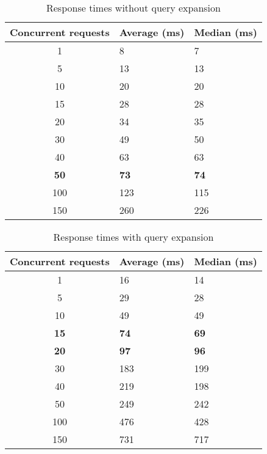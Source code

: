 \begin{table}[h]
    \centering
    \begin{tabular}{c|l|l}
    Concurrent requests & Average (ms) & Median (ms) \\ \hline
    1                   & 8            & 7           \\ \hline
    5                   & 13           & 13          \\ \hline
    10                  & 20           & 20          \\ \hline
    15                  & 28           & 28          \\ \hline
    20                  & 34           & 35          \\ \hline
    30                  & 49           & 50          \\ \hline
    40                  & 63           & 63          \\ \hline
    \textbf{50}         & \textbf{73}  & \textbf{74} \\ \hline
    100                 & 123          & 115         \\ \hline
    150                 & 260          & 226         \\ \hline
    \end{tabular}
    \caption{Response times without query expansion}
    \label{tbl:baseline}
\end{table}

\begin{table}[h]
    \centering
    \begin{tabular}{c|l|l}
     Concurrent requests & Average (ms) & Median (ms) \\ \hline
    1                    & 16           & 14          \\ \hline
    5                    & 29           & 28          \\ \hline
    10                   & 49           & 49          \\ \hline
    \textbf{15}          & \textbf{74}  & \textbf{69} \\ \hline
    \textbf{20}          & \textbf{97}  & \textbf{96} \\ \hline
    30                   & 183          & 199         \\ \hline
    40                   & 219          & 198         \\ \hline
    50                   & 249          & 242         \\ \hline
    100                  & 476          & 428         \\ \hline
    150                  & 731          & 717         \\ \hline
    \end{tabular}
    \caption{Response times with query expansion}
    \label{tbl:query-expansion}
\end{table}

